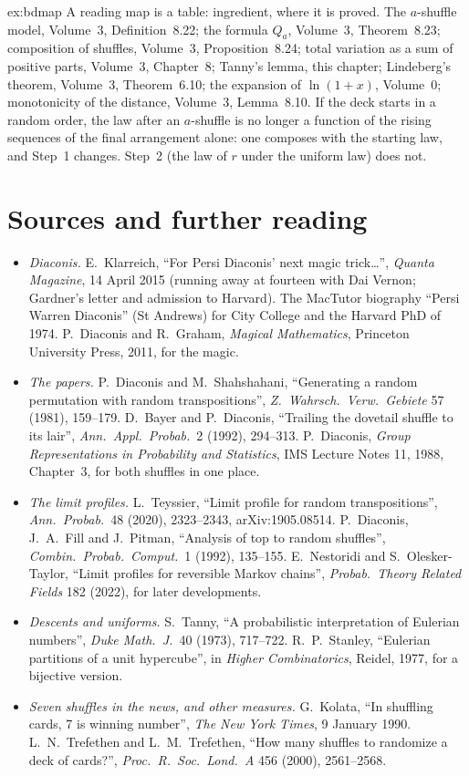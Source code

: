 \begin{solution}{ex:bdmap}
\idea A reading map is a table: ingredient, where it is proved.
\writeup The $a$-shuffle model, Volume~3, Definition~8.22; the formula $Q_a$, Volume~3, Theorem~8.23; composition of shuffles, Volume~3, Proposition~8.24;
total variation as a sum of positive parts, Volume~3, Chapter~8; Tanny's lemma, this chapter; Lindeberg's theorem, Volume~3, Theorem~6.10; the expansion of $\ln(1+x)$, Volume~0;
monotonicity of the distance, Volume~3, Lemma~8.10. If the deck starts in a random order, the law after an $a$-shuffle is no longer a function of the rising sequences of
the final arrangement alone: one composes with the starting law, and Step~1 changes. Step~2 (the law of $r$ under the uniform law) does not.
\end{solution}

\section*{Sources and further reading}

\begin{itemize}
\item \emph{Diaconis.} E.~Klarreich, ``For Persi Diaconis' next magic trick\dots'', \emph{Quanta Magazine}, 14 April 2015 (running away at fourteen with Dai Vernon; Gardner's letter
and admission to Harvard). The MacTutor biography ``Persi Warren Diaconis'' (St Andrews) for City College and the Harvard PhD of 1974. P.~Diaconis and R.~Graham, \emph{Magical
Mathematics}, Princeton University Press, 2011, for the magic.
\item \emph{The papers.} P.~Diaconis and M.~Shahshahani, ``Generating a random permutation with random transpositions'', \emph{Z.\ Wahrsch.\ Verw.\ Gebiete} 57 (1981), 159--179.
D.~Bayer and P.~Diaconis, ``Trailing the dovetail shuffle to its lair'', \emph{Ann.\ Appl.\ Probab.}\ 2 (1992), 294--313. P.~Diaconis, \emph{Group Representations in Probability and
Statistics}, IMS Lecture Notes 11, 1988, Chapter~3, for both shuffles in one place.
\item \emph{The limit profiles.} L.~Teyssier, ``Limit profile for random transpositions'', \emph{Ann.\ Probab.}\ 48 (2020), 2323--2343, arXiv:1905.08514. P.~Diaconis, J.~A.~Fill and J.~Pitman,
``Analysis of top to random shuffles'', \emph{Combin.\ Probab.\ Comput.}\ 1 (1992), 135--155. E.~Nestoridi and S.~Olesker-Taylor, ``Limit profiles for reversible Markov chains'',
\emph{Probab.\ Theory Related Fields} 182 (2022), for later developments.
\item \emph{Descents and uniforms.} S.~Tanny, ``A probabilistic interpretation of Eulerian numbers'', \emph{Duke Math.\ J.}\ 40 (1973), 717--722. R.~P.~Stanley, ``Eulerian partitions of a unit
hypercube'', in \emph{Higher Combinatorics}, Reidel, 1977, for a bijective version.
\item \emph{Seven shuffles in the news, and other measures.} G.~Kolata, ``In shuffling cards, 7 is winning number'', \emph{The New York Times}, 9 January 1990. L.~N.~Trefethen and
L.~M.~Trefethen, ``How many shuffles to randomize a deck of cards?'', \emph{Proc.\ R.\ Soc.\ Lond.\ A} 456 (2000), 2561--2568.
\end{itemize}

